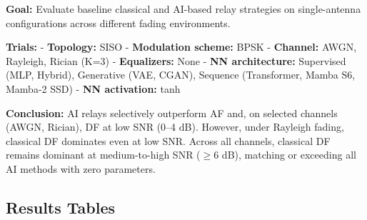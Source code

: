\documentclass[
  english,
  12pt,
  12pt,
  a4paper,
  oneside]{report}
\begin{document}
\textbf{Goal:} Evaluate baseline classical and AI-based relay strategies on single-antenna configurations across different fading environments.

\textbf{Trials:} - \textbf{Topology:} SISO - \textbf{Modulation scheme:} BPSK - \textbf{Channel:} AWGN, Rayleigh, Rician (K=3) - \textbf{Equalizers:} None - \textbf{NN architecture:} Supervised (MLP, Hybrid), Generative (VAE, CGAN), Sequence (Transformer, Mamba S6, Mamba-2 SSD) - \textbf{NN activation:} tanh

\textbf{Conclusion:} AI relays selectively outperform AF and, on selected channels (AWGN, Rician), DF at low SNR (0--4 dB). However, under Rayleigh fading, classical DF dominates even at low SNR. Across all channels, classical DF remains dominant at medium-to-high SNR (\(\geq 6\) dB), matching or exceeding all AI methods with zero parameters.

\subsection{Results Tables}\label{sec:results-tables}
\end{document}
